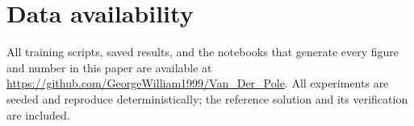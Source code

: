 \documentclass[11pt,a4paper]{article}
\begin{document}
\section*{Data availability}

All training scripts, saved results, and the notebooks that generate every
figure and number in this paper are available at
\url{https://github.com/GeorgeWilliam1999/Van_Der_Pole}. All experiments
are seeded and reproduce deterministically; the reference solution and its
verification are included.




\end{document}
